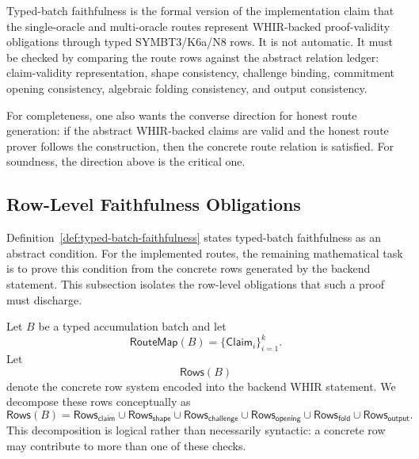 \documentclass[11pt]{article}
\theoremstyle{definition}
\begin{document}
Typed-batch faithfulness is the formal version of the implementation claim that
the single-oracle and multi-oracle routes represent WHIR-backed proof-validity
obligations through typed SYMBT3/K6a/N8 rows. It is not automatic. It must be
checked by comparing the route rows against the abstract relation ledger:
claim-validity representation, shape consistency, challenge binding, commitment
opening consistency, algebraic folding consistency, and output consistency.

For completeness, one also wants the converse direction for honest route
generation: if the abstract WHIR-backed claims are valid and the honest route
prover follows the construction, then the concrete route relation is satisfied.
For soundness, the direction above is the critical one.

\subsection{Row-Level Faithfulness Obligations}
\label{sec:row-level-faithfulness-obligations}

Definition~\ref{def:typed-batch-faithfulness} states typed-batch faithfulness as
an abstract condition. For the implemented routes, the remaining mathematical
task is to prove this condition from the concrete rows generated by the backend
statement. This subsection isolates the row-level obligations that such a proof
must discharge.

Let \(B\) be a typed accumulation batch and let
\[
  \mathsf{RouteMap}(B)=\{\mathsf{Claim}_i\}_{i=1}^k.
\]
Let
\[
  \mathsf{Rows}(B)
\]
denote the concrete row system encoded into the backend WHIR statement. We
decompose these rows conceptually as
\[
  \mathsf{Rows}(B)
  =
  \mathsf{Rows}_{\mathsf{claim}}
  \cup
  \mathsf{Rows}_{\mathsf{shape}}
  \cup
  \mathsf{Rows}_{\mathsf{challenge}}
  \cup
  \mathsf{Rows}_{\mathsf{opening}}
  \cup
  \mathsf{Rows}_{\mathsf{fold}}
  \cup
  \mathsf{Rows}_{\mathsf{output}}.
\]
This decomposition is logical rather than necessarily syntactic: a concrete row
may contribute to more than one of these checks.
\end{document}
